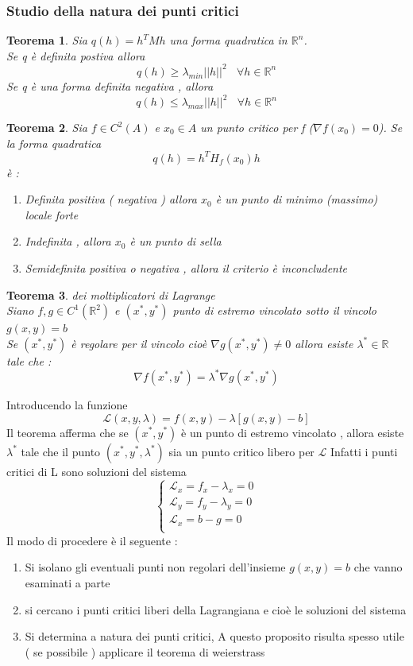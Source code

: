 \documentclass{article}
\newtheorem{teorema}{Teorema}[subsection]
\theoremstyle{definition}
\newcommand{\R}{\mathbb{R}}
\newcommand{\Rn}{\R^n}
\newcommand{\la}{\lambda}
\begin{document}
	\subsubsection{Studio della natura dei punti critici}
	\begin{teorema}
		Sia $q(h)=h^TMh$ una forma quadratica in $\Rn$. \\Se q è definita postiva allora $$q(h) \geq \la_{min}||h||^2 \ \ \ \ \forall h \in \Rn$$ Se q è una forma definita negativa , allora $$q(h)\leq \la_{max}||h||^2 \ \ \ \ \forall h \in \Rn$$
	\end{teorema}
	\begin{teorema}
		Sia $f \in C^2(A)$ e $x_0 \in A$ un punto critico per f ($\nabla f(x_0)=0$). Se la forma quadratica $$q(h)=h^TH_f(x_0)h$$ è :
		\begin{enumerate}
			\item Definita positiva ( negativa ) allora $x_0$ è un punto di minimo (massimo) locale forte 
			\item Indefinita , allora $x_0$ è un punto di sella 
			\item Semidefinita positiva o negativa , allora il criterio è inconcludente 
		\end{enumerate}
	\end{teorema}
	\begin{teorema}
		dei moltiplicatori di Lagrange \\
		Siano $f,g \in C^1(\R^2)$ e $(x^*,y^*)$ punto di estremo vincolato sotto il vincolo $g(x,y)=b$\\
		Se $(x^*,y^*)$ è regolare per il vincolo cioè $\nabla g(x^*,y^*)\neq 0$ allora esiste $\la^* \in \R$ tale che : 
		$$\nabla f(x^*,y^*)=\la^* \nabla g(x^*,y^*)$$
	\end{teorema}
	Introducendo la funzione $$\mathcal{L}(x,y,\la)=f(x,y)-\la[g(x,y)-b]$$ 
	Il teorema afferma che se $(x^*,y^*)$ è un punto di estremo vincolato , allora  esiste $\la^*$ tale che il punto $(x^*,y^*,\la^*)$ sia un punto critico libero per $\mathcal{L}$ Infatti i punti critici di L sono soluzioni del sistema $$\begin{cases}
		\mathcal{L}_x=f_x-\la_x=0 \\
		\mathcal{L}_y=f_y-\la_y=0 \\
		\mathcal{L}_x=b-g=0 \\
	\end{cases}$$
	Il modo di procedere è il seguente : 
	\begin{enumerate}
		\item Si isolano gli eventuali punti non regolari dell'insieme $g(x,y)=b$ che vanno esaminati a parte
		\item si cercano i punti critici liberi della Lagrangiana e cioè le soluzioni del sistema 
		\item Si determina a natura dei punti critici, A questo proposito risulta spesso utile ( se possibile ) applicare il teorema di weierstrass
	\end{enumerate}
\end{document}
